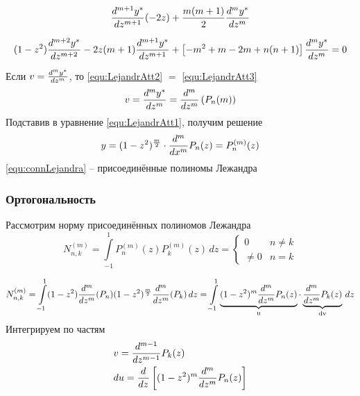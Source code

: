 \begin{equation*}
	\frac{d^{m + 1}y^*}{dz^{m + 1}} (- 2 z) + \frac{m(m + 1)}{2} \frac{d^{m}y^*}{dz^{m}} 
\end{equation*}

\begin{equation}
    (1 - z^2) \frac{d^{m + 2}y^*}{dz^{m + 2}} - 2 z (m + 1) \frac{d^{m + 1}y^*}{dz^{m + 1}} + \left[- m^2 + m - 2 m + n(n + 1) \right] \frac{d^{m}y^*}{dz^{m}} = 0
	\label{equ:LejandrAtt3}
\end{equation}

Если $v = \frac{d^{m}y^*}{dz^{m}}$, то \eqref{equ:LejandrAtt2} $=$ \eqref{equ:LejandrAtt3}
\[ 
	v = \frac{d^{m}y^*}{dz^{m}} = \frac{d^{m}}{dz^{m}} \left( P_n(m) \right)
\]
Подставив в уравнение \eqref{equ:LejandrAtt1}, получим решение
\begin{equation}
    y = (1 - z^2)^\frac{m}{2} \cdot \frac{d^{m}}{dx^{m}} P_n (z)= P_n^{(m)} (z)
	\label{equ:connLejandra}
\end{equation}
\eqref{equ:connLejandra} -- присоединённые полиномы Лежандра


\subsubsection{Ортогональность}\label{que:30}
Рассмотрим норму присоединённых полиномов Лежандра
\[
	N_{n, k}^{(m)} = \int\limits_{-1}^1 P_n^{(m)}(z)P_k^{(m)}(z)\, dz  =
	\begin{cases}
	    0 & n \neq k\\
		\neq 0 &n=k
	\end{cases}
\]

\[
    N_{n, k}^{(m)} = \int\limits_{-1}^1 (1 -z^2) \frac{d^{m}}{dz^{m}} (P_n) (1 - z^2)^\frac{m}{2} \frac{d^{m}}{dz^{m}} (P_k) \, dz = \int\limits_{-1}^1 \underbrace{(1 - z^2)^m \frac{d^{m}}{dz^{m}} P_n(z)}_\text{u} \cdot \underbrace{\frac{d^{m}}{dz^{m}} P_k(z)}_\text{dv} \, dz
\]
Интегрируем по частям
\begin{align*}
    &v = \frac{d^{m - 1}}{dz^{m - 1}} P_k(z)\\
    &du = \frac{d^{}}{dz^{}} \left[(1 - z^2)^m \frac{d^{m}}{dz^{m}} P_n(z) \right]
\end{align*}



